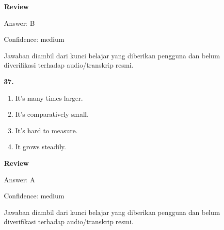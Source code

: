 \documentclass[12pt]{article}
\begin{document}
\par
\begingroup
\setlength{\parskip}{0pt}
\setlength{\parindent}{0pt}
\textbf{Review}\par
Answer: B\par
Confidence: medium\par
Jawaban diambil dari kunci belajar yang diberikan pengguna dan belum diverifikasi terhadap audio/transkrip resmi.\par
\endgroup
\par
\vspace{0.25\baselineskip}
\noindent\textbf{37.}
\begin{enumerate}[label=(\Alph*),leftmargin=*,itemsep=0.2em]
\item It's many times larger.
\item It's comparatively small.
\item It's hard to measure.
\item It grows steadily.
\end{enumerate}
\par
\begingroup
\setlength{\parskip}{0pt}
\setlength{\parindent}{0pt}
\textbf{Review}\par
Answer: A\par
Confidence: medium\par
Jawaban diambil dari kunci belajar yang diberikan pengguna dan belum diverifikasi terhadap audio/transkrip resmi.\par
\endgroup
\par
\vspace{0.25\baselineskip}
\end{document}
